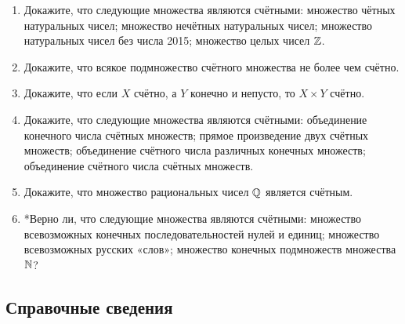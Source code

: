 \begin{enumerate}
\item Докажите, что следующие множества являются счётными:
\ipunkt множество чётных натуральных чисел;
\ipunkt множество нечётных натуральных чисел;
\ipunkt множество натуральных чисел без числа 2015;
\ipunkt множество целых чисел $\mathbb Z$.

\item Докажите, что всякое подмножество счётного множества не более чем счётно.

\item Докажите, что если $X$ счётно, а $Y$ конечно и непусто, то $X \times Y$ счётно.

\item Докажите, что следующие множества являются счётными:
\ipunkt объединение конечного числа счётных множеств;
\ipunkt прямое произведение двух счётных множеств;
\ipunkt объединение счётного числа различных конечных множеств;
\ipunkt объединение счётного числа счётных множеств.

\item Докажите, что множество рациональных чисел $\mathbb Q$ является счётным.

\item *Верно ли, что следующие множества являются счётными:
\ipunkt множество всевозможных конечных последовательностей нулей и единиц;
\ipunkt множество всевозможных русских «слов»;
\ipunkt множество конечных подмножеств множества $\mathbb N$?



\end{enumerate}

\subsection*{Справочные сведения}





